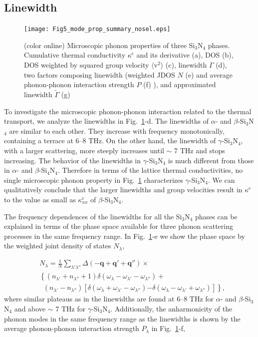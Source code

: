 \documentclass[twocolumn,amsmath,amssymb,a4paper,prb,superscriptaddress,floatfix]{revtex4-1}
\begin{document}
\subsection{Linewidth}
\begin{figure}[ht]
 \begin{center}
  \texttt{[image: Fig5\_mode\_prop\_summary\_nosel.eps]}
  \caption{(color online) Microscopic phonon properties of three Si$_3$N$_4$
	  phases. Cumulative thermal conductivity $\kappa^\text{c}$ and its derivative
	  (a), DOS (b), DOS weighted by squared group velocity
	  $\langle\text{v}^2\rangle$ (c), linewidth $\Gamma$ (d), two factors
	  composing linewidth (weighted JDOS $N$ (e) and average phonon-phonon
	  interaction strength $P$ (f) ), and approximated linewidth
	  $\tilde{\Gamma}$ (g) 
  \label{fig:Fig5_338_rev} }
 \end{center}
\end{figure}
To investigate the microscopic phonon-phonon interaction related to the thermal
transport, we analyze the linewidths in Fig.~\ref{fig:Fig5_338_rev}-d.
The linewidths of $\alpha$- and $\beta$-Si$_3$N$_4$ are similar to each other.
They increase with frequency monotonically, containing a terrace at 6--8 THz.
On the other hand, the linewidth of $\gamma$-Si$_3$N$_4$, with a larger
scattering, more steeply increases until $\sim$ 7 THz and stops increasing.
The behavior of the linewidths in $\gamma$-Si$_3$N$_4$ is much different from
those in $\alpha$- and $\beta$-Si$_4$N$_4$.
Therefore in terms of the lattice thermal conductivities, no single microscopic
phonon property in Fig.~\ref{fig:Fig5_338_rev} characterizes
$\gamma$-Si$_3$N$_4$.
We can qualitatively conclude that the larger linewidths and group velocities
result in $\kappa^\text{c}$ to the value as small as $\kappa^\text{c}_{xx}$ of
$\beta$-Si$_3$N$_4$.


The frequency dependences of the linewidths for all the Si$_3$N$_4$ phases can
be explained in terms of the phase space available for three phonon scattering
processes in the same frequency range. In Fig.~\ref{fig:Fig5_338_rev}-e we show
the phase space by the weighted joint density of states $N_\lambda$, 


\begin{align}
 \label{eq:wjdos}
 &N_\lambda = \frac{1}{N}
  \sum_{\lambda' \lambda''}
  \Delta(-\mathbf{q}+\mathbf{q}'+\mathbf{q}'') \times \nonumber \\ 
 &\left\{ (n_{\lambda'} + n_{\lambda''}+1) 
   \delta(\omega_\lambda-\omega_{\lambda'}-\omega_{\lambda''}) \right.
   + \nonumber \\ 
 &\;\;(n_{\lambda'}-n_{\lambda''})
  \left[\delta(\omega_\lambda +\omega_{\lambda'}-\omega_{\lambda''})
 \right. 
 \left. -\left. \delta(\omega_\lambda - \omega_{\lambda'}+\omega_{\lambda''})
 \right]\right\},
\end{align}
where similar plateaus as in  the linewidths are found  at 6--8 THz for 
$\alpha$- and $\beta$-Si$_3$N$_4$ and above $\sim$ 7 THz for $\gamma$-Si$_3$N$_4$. 
Additionally, the anharmonicity of the phonon modes in the same frequency range
as the linewidths is shown by the average phonon-phonon interaction strength
$P_\lambda$ in Fig.~\ref{fig:Fig5_338_rev}-f, 
\end{document}
